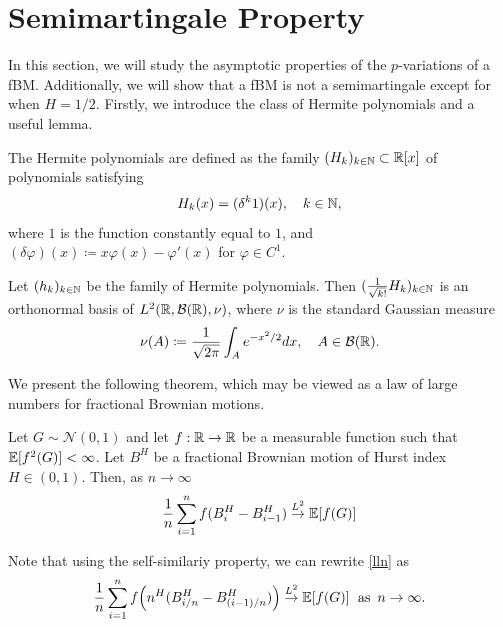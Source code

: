 \section{Semimartingale Property}
In this section, we will study the asymptotic properties of the $p$-variations of a fBM. Additionally, we will show that a fBM is not a semimartingale except for when $H=1/2$. Firstly, we introduce the class of Hermite polynomials and a useful lemma.
\begin{defn}
    The Hermite polynomials are defined as the family $(H_{k})_{k\in \mathbb{N}}\subset \mathbb{R}[x]$ of polynomials satisfying
    \begin{equation}
        H_{k}(x)=(\delta^{k}1)(x), \quad k\in\mathbb{N},
    \end{equation}
    where $1$ is the function constantly equal to $1$, and $(\delta\varphi)(x)\coloneqq x\varphi(x)-\varphi'(x)$ for $\varphi\in C^{1}$.
\end{defn}
\begin{lem}\label{l2lemma}
    Let $(h_{k})_{k\in \mathbb{N}}$ be the family of Hermite polynomials. Then $(\frac{1}{\sqrt{k!}}H_{k})_{k\in\mathbb{N}}$ is an orthonormal basis of $L^{2}\left(\R,\mathcal{B}(\R),\nu\right)$, where $\nu$ is the standard Gaussian measure
    \begin{equation}
        \nu(A)\coloneqq \frac{1}{\sqrt{2\pi}}\int_{A}e^{-x^{2}/2}dx,\quad A\in\mathcal{B}(\mathbb{R}).
    \end{equation}
\end{lem}
We present the following theorem, which may be viewed as a law of large numbers for fractional Brownian motions.
\begin{thm}\label{llnthm}
    Let $G\sim\mathcal{N}(0,1)$ and let $f:\mathbb{R}\to\mathbb{R}$ be a measurable function such that $\mathbb{E}[f^{2}(G)]<\infty$. Let $B^H$ be a fractional Brownian motion of Hurst index $H\in (0,1)$. Then, as $n\to\infty$
    \begin{equation}\label{lln}
        \frac{1}{n}\sum_{i=1}^{n}f(B^{H}_{i}-B^{H}_{i-1})\overset{L^{2}}{\to} \mathbb{E}[f(G)]
    \end{equation}
\end{thm}
Note that using the self-similariy property, we can rewrite \eqref{lln} as
\begin{equation}
     \frac{1}{n}\sum_{i=1}^{n}f\left(n^{H}(B^{H}_{i/n}-B^{H}_{(i-1)/n})\right)\overset{L^{2}}{\to} \E[f(G)] \hspace{6 pt}\mathrm{as}\hspace{5 pt}n\to\infty.
\end{equation}
